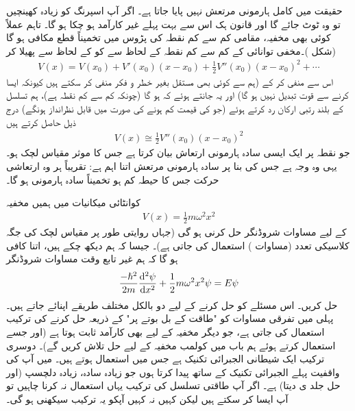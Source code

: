 حقیقت میں کامل ہارمونی مرتعش نہیں پایا جاتا ہے۔ اگر آپ اسپرنگ کو زیادہ کھینچیں تو وہ ٹوٹ جائے گا اور قانون ہک اس سے بہت پہلے غیر کارآمد ہو چکا ہو گا۔ تاہم عملاً کوئی بھی مخفیہ، مقامی کم سے کم نقطہ کی پڑوس میں تخمیناً قطع مکافی
 ہو گا (شکل )۔مخفی توانائی  کے کم سے کم نقطہ  کے لحاظ سے  کو  کے لحاظ سے پھیلا کر
\begin{align*}
V(x)=V( x_{0})+V'(x_{0})(x-x_{0})+\frac{1}{2}V''(x_{0})(x-x_{0})^{2}+\cdots
\end{align*}
اس سے  منفی کر کے (ہم  سے کوئی بھی مستقل بغیر خطر و فکر منفی کر سکتے ہیں کیونکہ ایسا کرنے سے قوت تبدیل نہیں ہو گا) اور یہ جانتے ہوئے کہ  ہو گا (چونکہ  کم سے کم نقطہ ہے)، ہم تسلسل کے بلند رتبی ارکان رد کرتے ہوئے (جو  کی قیمت کم ہونے کی صورت میں قابل نظرانداز ہونگے) درج ذیل حاصل کرتے ہیں
\begin{align*}
V(x)\cong\frac{1}{2}V''(x_{0})(x-x_{0})^{2}
\end{align*}
جو نقطہ  پر ایک ایسی سادہ ہارمونی ارتعاش بیان کرتا ہے جس کا موثر مقیاس لچک  ہو۔ یہی وہ وجہ ہے جس کی بنا پر سادہ ہارمونی مرتعش اتنا اہم ہے: تقریباً ہر وہ ارتعاشی حرکت جس کا حیطہ کم ہو تخمیناً سادہ ہارمونی ہو گا۔

کوانٹائی میکانیات میں ہمیں مخفیہ
\begin{align}\label{مساوات_شروڈنگر_مخفیہ_ہارمونی}
V(x)=\frac{1}{2}m\omega ^{2}x^{2}
\end{align}
کے لیے مساوات شروڈنگر حل کرنی ہو گی (جہاں روایتی طور پر مقیاس لچک کی جگہ کلاسیکی تعدد (مساوات ) استعمال کی جاتی ہے)۔ جیسا کہ ہم دیکھ چکے ہیں، اتنا کافی ہو گا کہ ہم غیر تابع وقت مساوات شروڈنگر
\begin{align}\label{مساوات_شروڈنگر_مخفی_قوہ_الف}
\frac{-\hslash ^{2}}{2m}\frac{\dif{^{2}\psi}}{\dif{x^{2}}}+\frac{1}{2}m\omega ^{2}x^{2}\psi=E\psi
\end{align}
حل کریں۔ اس مسئلے کو حل کرنے کے لیے دو بالکل مختلف طریقے اپنائے جاتے ہیں۔ پہلی میں تفرقی مساوات کو "طاقت کے بل بوتے پر"  کے ذریعہ حل کرنے کی ترکیب استعمال کی جاتی ہے، جو دیگر مخفیہ کے لیے بھی کارآمد ثابت ہوتا ہے (اور جسے استعمال کرتے ہوئے ہم باب  میں کولمب مخفیہ کے لیے حل تلاش کریں گے)۔ دوسری ترکیب ایک شیطانی الجبرائی تکنیک ہے جس میں  استعمال ہوتے ہیں۔ میں آپ کی واقفیت پہلے الجبرائی تکنیک کے ساتھ پیدا کرتا ہوں جو زیادہ سادہ، زیادہ دلچسپ (اور حل جلد ی دیتا) ہے۔ اگر آپ طاقتی تسلسل کی ترکیب یہاں استعمال نہ کرنا چاہیں تو آپ ایسا کر سکتے ہیں لیکن کہیں نہ کہیں آپکو یہ ترکیب سیکھنی ہو گی۔

